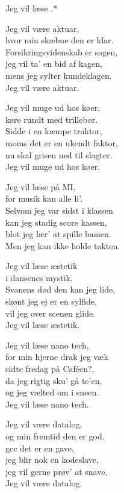 \begin{song}{Jeg vil læse .*}
  \begin{SBVerse}
    Jeg vil være aktuar,\\
    hvor min skæbne den er klar.\\
    Forsikringsvidenskab er sagen,\\
    jeg vil ta' en bid af kagen,\\
    mens jeg sylter kundeklagen.\\
    Jeg vil være aktuar.
  \end{SBVerse}

  \begin{SBVerse}
    Jeg vil muge ud hos køer,\\
    køre rundt med trillebør.\\
    Sidde i en kæmpe traktor,\\
    moms det er en ukendt faktor,\\
    nu skal grisen ned til slagter.\\
    Jeg vil muge ud hos køer.
  \end{SBVerse}

  \begin{SBVerse}
    Jeg vil læse på MI,\\
    for musik kan alle li'.\\
    Selvom jeg var sidst i klassen\\
    kan jeg stadig score kassen,\\
    blot jeg lær' at spille bassen.\\
    Men jeg kan ikke holde takten.
  \end{SBVerse}

  \begin{SBVerse}
    Jeg vil læse æstetik\\
    i dansenes mystik.\\
    Svanens død den kan jeg lide,\\
    skønt jeg ej er en sylfide,\\
    vil jeg over scenen glide.\\
    Jeg vil læse æstetik.
  \end{SBVerse}

  \begin{SBVerse}
    Jeg vil læse nano tech,\\
    for min hjerne drak jeg væk\\
    sidte fredag på Caféen?,\\
    da jeg rigtig sku' gå te'en,\\
    og jeg vælted om i sneen.\\
    Jeg vil læse nano tech.
  \end{SBVerse}

  \begin{SBVerse}
    Jeg vil være datalog,\\
    og min fremtid den er god.\\
    gcc det er en gave,\\
    jeg blir nok en kodeslave,\\
    jeg vil gerne prøv' at snave.\\
    Jeg vil være datalog.
  \end{SBVerse}
\end{song}